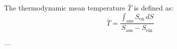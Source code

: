 The thermodynamic mean temperature \( \bar{T} \) is defined as:  
\[
\bar{T} = \frac{\int_{\text{aus}} S_{\text{en}} \, dS}{S_{\text{aus}} - S_{\text{ein}}}
\]

---